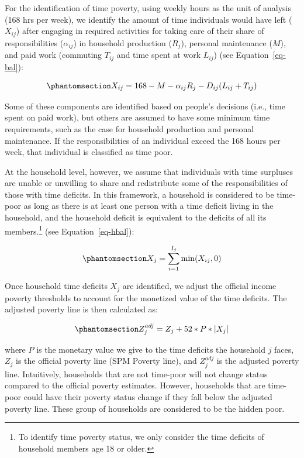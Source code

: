 \documentclass[
  11pt,
]{article}
\begin{document}
For the identification of time poverty, using weekly hours as the unit
of analysis (168 hrs per week), we identify the amount of time
individuals would have left (\(X_{ij}\)) after engaging in required
activities for taking care of their share of responsibilities
(\(\alpha_{ij}\)) in household production (\(R_j\)), personal
maintenance (\(M\)), and paid work (commuting \(T_{ij}\) and time spent
at work \(L_{ij}\)) (see Equation~\ref{eq-bal}):

\begin{equation}\phantomsection\label{eq-bal}{X_{ij} = 168 - M - \alpha_{ij}R_j-D_{ij}(L_{ij}+T_{ij})
}\end{equation}

Some of these components are identified based on people's decisions
(i.e., time spent on paid work), but others are assumed to have some
minimum time requirements, such as the case for household production and
personal maintenance. If the responsibilities of an individual exceed
the 168 hours per week, that individual is classified as time poor.

At the household level, however, we assume that individuals with time
surpluses are unable or unwilling to share and redistribute some of the
responsibilities of those with time deficits. In this framework, a
household is considered to be time-poor as long as there is at least one
person with a time deficit living in the household, and the household
deficit is equivalent to the deficits of all its members.\footnote{To
  identify time poverty status, we only consider the time deficits of
  household members age 18 or older.} (see Equation~\ref{eq-hbal}):

\begin{equation}\phantomsection\label{eq-hbal}{X_{j} = \sum_{i=1}^{I_j} \min(X_{ij},0)
}\end{equation}

Once household time deficits \(X_{j}\) are identified, we adjust the
official income poverty thresholds to account for the monetized value of
the time deficits. The adjusted poverty line is then calculated as:

\begin{equation}\phantomsection\label{eq-limtip}{Z_{j}^{adj} = Z_{j} + 52*P* |X_{j}|
}\end{equation}

where \(P\) is the monetary value we give to the time deficits the
household \({j}\) faces, \(Z_{j}\) is the official poverty line (SPM
Poverty line), and \(Z_{j}^{adj}\) is the adjusted poverty line.
Intuitively, households that are not time-poor will not change status
compared to the official poverty estimates. However, households that are
time-poor could have their poverty status change if they fall below the
adjusted poverty line. These group of households are considered to be
the hidden poor.
\end{document}
